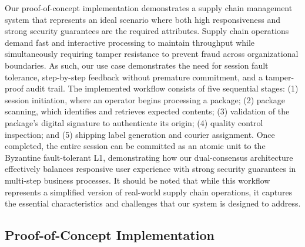 \documentclass[conference]{IEEEtran}
\begin{document}
Our proof-of-concept implementation demonstrates a supply chain management system that represents an ideal scenario where both high responsiveness and strong security guarantees are the required attributes. Supply chain operations demand fast and interactive processing to maintain throughput while simultaneously requiring tamper resistance to prevent fraud across organizational boundaries. As such, our use case demonstrates the need for session fault tolerance, step-by-step feedback without premature commitment, and a tamper-proof audit trail. The implemented workflow consists of five sequential stages: 
(1) session initiation, where an operator begins processing a package; (2) package scanning, which identifies and retrieves expected contents; 
(3) validation of the package's digital signature to authenticate its origin; 
(4) quality control inspection; and 
(5) shipping label generation and courier assignment. Once completed, the entire session can be committed as an atomic unit to the Byzantine fault-tolerant L1, demonstrating how our dual-consensus architecture effectively balances responsive user experience with strong security guarantees in multi-step business processes. It should be noted that while this workflow represents a simplified version of real-world supply chain operations, it captures the essential characteristics and challenges that our system is designed to address.

\subsection{Proof-of-Concept Implementation}
\end{document}
